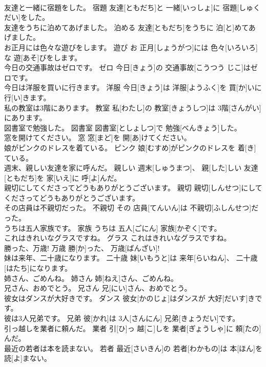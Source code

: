 \documentclass[8pt]{extreport}
\begin{document}
\begin{CJK}{UTF8}{min}
\\	友達と一緒に宿題をした。	宿題	友達[ともだち]と 一緒[いっしょ]に 宿題[しゅくだい]をした。	
\\	友達をうちに泊めてあげました。	泊める	友達[ともだち]をうちに 泊[と]めてあげました。	
\\	お正月には色々な遊びをします。	遊び	お 正月[しょうがつ]には 色々[いろいろ]な 遊[あそ]びをします。	
\\	今日の交通事故はゼロです。	ゼロ	今日[きょう]の 交通事故[こうつう じこ]はゼロです。	
\\	今日は洋服を買いに行きます。	洋服	今日[きょう]は 洋服[ようふく]を 買[か]いに 行[い]きます。	
\\	私の教室は3階にあります。	教室	私[わたし]の 教室[きょうしつ]は 3階[さんがい]にあります。	
\\	図書室で勉強した。	図書室	図書室[としょしつ]で 勉強[べんきょう]した。	
\\	窓を開けてください。	窓	窓[まど]を 開[あ]けてください。	
\\	娘がピンクのドレスを着ている。	ピンク	娘[むすめ]がピンクのドレスを 着[き]ている。	
\\	週末、親しい友達を家に呼んだ。	親しい	週末[しゅうまつ]、 親[した]しい 友達[ともだち]を 家[いえ]に 呼[よ]んだ。	
\\	親切にしてくださってどうもありがとうございます。	親切	親切[しんせつ]にしてくださってどうもありがとうございます。	
\\	その店員は不親切だった。	不親切	その 店員[てんいん]は 不親切[ふしんせつ]だった。	
\\	うちは五人家族です。	家族	うちは 五人[ごにん] 家族[かぞく]です。	
\\	これはきれいなグラスですね。	グラス	これはきれいなグラスですね。	
\\	勝った、万歳!	万歳	勝[か]った、 万歳[ばんざい]!	
\\	妹は来年、二十歳になります。	二十歳	妹[いもうと]は 来年[らいねん]、 二十歳[はたち]になります。	
\\	姉さん、ごめんね。	姉さん	姉[ねえ]さん、ごめんね。	
\\	兄さん、おめでとう。	兄さん	兄[にい]さん、おめでとう。	
\\	彼女はダンスが大好きです。	ダンス	彼女[かのじょ]はダンスが 大好[だいす]きです。	
\\	彼は3人兄弟です。	兄弟	彼[かれ]は 3人[さんにん] 兄弟[きょうだい]です。	
\\	引っ越しを業者に頼んだ。	業者	引[ひ]っ 越[こ]しを 業者[ぎょうしゃ]に 頼[たの]んだ。	
\\	最近の若者は本を読まない。	若者	最近[さいきん]の 若者[わかもの]は 本[ほん]を 読[よ]まない。	

\end{CJK}
\end{document}
